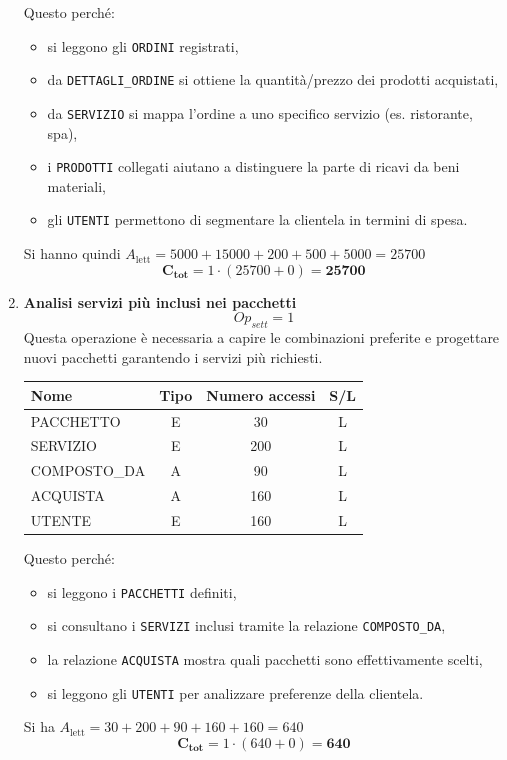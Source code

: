 \documentclass[a4paper,12pt]{report}
\begin{document}
\begin{enumerate}
    Questo perché:  
    \begin{itemize}
        \item si leggono gli \texttt{ORDINI} registrati,  
        \item da \texttt{DETTAGLI\_ORDINE} si ottiene la quantità/prezzo dei prodotti acquistati,  
        \item da \texttt{SERVIZIO} si mappa l’ordine a uno specifico servizio (es. ristorante, spa),  
        \item i \texttt{PRODOTTI} collegati aiutano a distinguere la parte di ricavi da beni materiali,  
        \item gli \texttt{UTENTI} permettono di segmentare la clientela in termini di spesa.  
    \end{itemize}

    Si hanno quindi $A_{\text{lett}} = 5000 + 15000 + 200 + 500 + 5000 = 25700$  
    $$\mathbf{C_{tot}} = 1 \cdot (25700 + 0) = \mathbf{25700}$$


    \item {\large \textbf{Analisi servizi più inclusi nei pacchetti}} \label{op23}
   $$
   {Op}_{sett} = 1
   $$
    Questa operazione è necessaria a capire le combinazioni preferite e progettare nuovi pacchetti garantendo i servizi più richiesti.

    \begin{table}[H]
    \centering
    \small
    \renewcommand{\arraystretch}{1.15}
    \begin{tabularx}{0.8\textwidth}{|X|c|c|c|}
        \hline
        \rowcolor{gray!20}
        \textbf{Nome} & \textbf{Tipo} & \textbf{Numero accessi} & \textbf{S/L} \\
        \hline
        PACCHETTO & E & 30 & L \\
        SERVIZIO & E & 200 & L \\
        COMPOSTO\_DA & A & 90 & L \\
        ACQUISTA & A & 160 & L \\
        UTENTE & E & 160 & L \\
        \hline
    \end{tabularx}
    \end{table}

    Questo perché:  
    \begin{itemize}
        \item si leggono i \texttt{PACCHETTI} definiti,  
        \item si consultano i \texttt{SERVIZI} inclusi tramite la relazione \texttt{COMPOSTO\_DA},  
        \item la relazione \texttt{ACQUISTA} mostra quali pacchetti sono effettivamente scelti,  
        \item si leggono gli \texttt{UTENTI} per analizzare preferenze della clientela.  
    \end{itemize}

    Si ha $A_{\text{lett}} = 30 + 200 + 90 + 160 + 160 = 640$  
    $$\mathbf{C_{tot}} = 1 \cdot (640 + 0) = \mathbf{640}$$
\end{enumerate}
\end{document}
